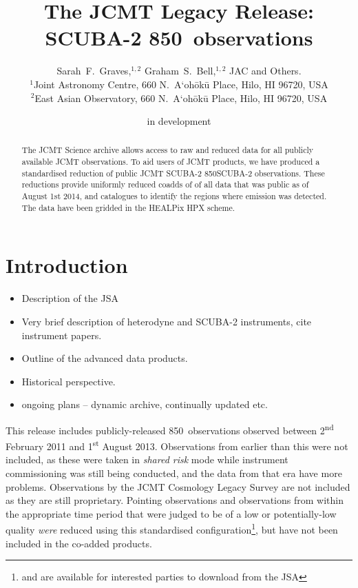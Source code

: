 \documentclass[usenatbib]{mn2e}
\title[SCUBA-2 850\um\ Legacy Release]%
{The JCMT Legacy Release: SCUBA-2 850\bmicron\ observations}
\author[S.~F.~Graves et~al.]
{Sarah~F.~Graves,$^{1,2}$
Graham~S.~Bell,$^{1,2}$
JAC
and
Others.\\
$^1$Joint Astronomy Centre, 660 N.\ A`oh\=ok\=u Place, Hilo, HI 96720, USA\\
$^2$East Asian Observatory, 660 N.\ A`oh\=ok\=u Place, Hilo, HI 96720, USA
}
\newcommand{\um}{\micron}
\begin{document}
\date{in development}

\pagerange{\pageref{firstpage}--\pageref{lastpage}} 

\maketitle

\label{firstpage}

\begin{abstract}
  The JCMT Science archive allows access to raw and reduced data for
  all publicly available JCMT observations. To aid users of JCMT
  products, we have produced a standardised reduction of public JCMT
  SCUBA-2 850\micron SCUBA-2 observations. These reductions provide
  uniformly reduced coadds of of all data that was public as of August
  1st 2014, and catalogues to identify the regions where emission was
  detected. The data have been gridded in the HEALPix HPX scheme.
\end{abstract}

\section{Introduction}
\begin{itemize}
\item Description of the JSA \citep{2015Economou}
\item Very brief description of heterodyne and SCUBA-2 instruments, cite instrument papers. \citep{2013MNRAS.430.2513H} \citep{2009MNRAS.399.1026B}
\item Outline of the advanced data products. \citep{2014SPIE.9152E..2JB}
\item Historical perspective. \citep{2011ASPC..442..203E}
\item ongoing plans -- dynamic archive, continually updated etc.
\end{itemize}

This release includes publicly-released 850\um\ observations observed
between 2\textsuperscript{nd} February 2011 and 1\textsuperscript{st}
August 2013. Observations from earlier than this were not included, as
these were taken in \emph{shared risk} mode while instrument
commissioning was still being conducted, and the data from that era
have more problems.  Observations by the JCMT Cosmology Legacy Survey
\citep{2013MNRAS.432...53G} are not included as they are still
proprietary. Pointing observations and observations from within the
appropriate time period that were judged to be of a low or
potentially-low quality \emph{were} reduced using this standardised
configuration\footnote{and are available for interested parties to
  download from the JSA}, but have not been included in the co-added
products.
\end{document}
